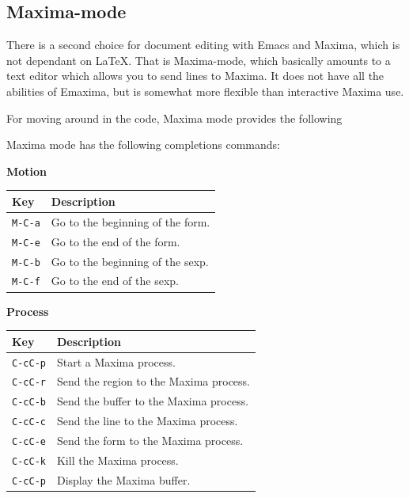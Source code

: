 \subsection{Maxima-mode}

There is a second choice for document editing with Emacs and Maxima, which 
is not dependant on LaTeX.  That is Maxima-mode, which basically amounts
to a text editor which allows you to send lines to Maxima.  It does not
have all the abilities of Emaxima, but is somewhat more flexible than interactive
Maxima use.

For moving around in the code, Maxima mode provides the following

\noindent
Maxima mode has the following completions commands:

\textbf{Motion}

\smallskip

\noindent
\begin{tabular}{p{\firstcol}p{\secondcol}}
\hline
\textbf{Key} & \textbf{Description}\\
\hline
\texttt{M-C-a} & Go to the beginning of the form.\\
\texttt{M-C-e} & Go to the end of the form.\\
\texttt{M-C-b} & Go to the beginning of the sexp.\\
\texttt{M-C-f} & Go to the end of the sexp.
\end{tabular}

\smallskip

\noindent
\textbf{Process}

\smallskip

\noindent
\begin{tabular}{p{\firstcol}p{\secondcol}}
\hline
\textbf{Key} & \textbf{Description}\\
\hline
\texttt{C-cC-p} & Start a Maxima process.\\
\texttt{C-cC-r} & Send the region to the Maxima process.\\
\texttt{C-cC-b} & Send the buffer to the Maxima process.\\
\texttt{C-cC-c} & Send the line to the Maxima process.\\
\texttt{C-cC-e} & Send the form to the Maxima process.\\
\texttt{C-cC-k} & Kill the Maxima process.\\
\texttt{C-cC-p} & Display the Maxima buffer.
\end{tabular}

\smallskip


